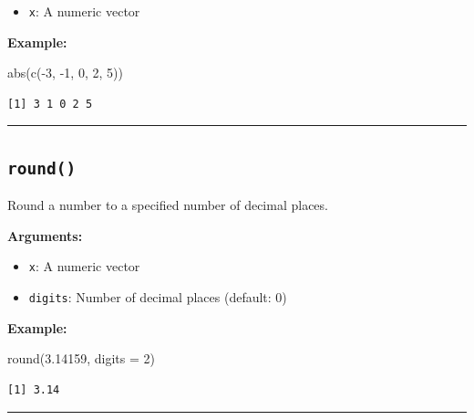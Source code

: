 \documentclass[
  letterpaper,
  DIV=11,
  numbers=noendperiod]{scrreprt}
\newenvironment{Shaded}{\begin{snugshade}}{\end{snugshade}}
\newcommand{\AttributeTok}[1]{\textcolor[rgb]{0.40,0.45,0.13}{#1}}
\newcommand{\DecValTok}[1]{\textcolor[rgb]{0.68,0.00,0.00}{#1}}
\newcommand{\FloatTok}[1]{\textcolor[rgb]{0.68,0.00,0.00}{#1}}
\newcommand{\FunctionTok}[1]{\textcolor[rgb]{0.28,0.35,0.67}{#1}}
\newcommand{\NormalTok}[1]{\textcolor[rgb]{0.00,0.23,0.31}{#1}}
\newcommand{\SpecialCharTok}[1]{\textcolor[rgb]{0.37,0.37,0.37}{#1}}
\providecommand{\tightlist}{%
  \setlength{\itemsep}{0pt}\setlength{\parskip}{0pt}}
\begin{document}
\begin{itemize}
\tightlist
\item
  \texttt{x}: A numeric vector
\end{itemize}

\textbf{Example:}

\begin{Shaded}
\begin{Highlighting}[]
\FunctionTok{abs}\NormalTok{(}\FunctionTok{c}\NormalTok{(}\SpecialCharTok{{-}}\DecValTok{3}\NormalTok{, }\SpecialCharTok{{-}}\DecValTok{1}\NormalTok{, }\DecValTok{0}\NormalTok{, }\DecValTok{2}\NormalTok{, }\DecValTok{5}\NormalTok{))}
\end{Highlighting}
\end{Shaded}

\begin{verbatim}
[1] 3 1 0 2 5
\end{verbatim}

\begin{center}\rule{0.5\linewidth}{0.5pt}\end{center}

\subsection{\texorpdfstring{\texttt{round()}}{round()}}\label{round}

Round a number to a specified number of decimal places.

\textbf{Arguments:}

\begin{itemize}
\tightlist
\item
  \texttt{x}: A numeric vector
\item
  \texttt{digits}: Number of decimal places (default: 0)
\end{itemize}

\textbf{Example:}

\begin{Shaded}
\begin{Highlighting}[]
\FunctionTok{round}\NormalTok{(}\FloatTok{3.14159}\NormalTok{, }\AttributeTok{digits =} \DecValTok{2}\NormalTok{)}
\end{Highlighting}
\end{Shaded}

\begin{verbatim}
[1] 3.14
\end{verbatim}

\begin{center}\rule{0.5\linewidth}{0.5pt}\end{center}
\end{document}
